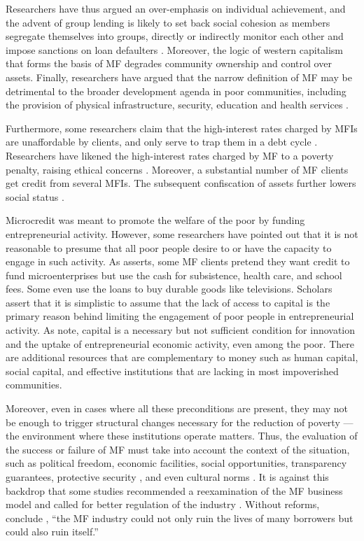 \documentclass[a4paper, nobind]{templates/ociamthesis}
\begin{document}
Researchers have thus argued an over-emphasis on individual achievement, and the advent of group lending is likely to set back social cohesion as members segregate themselves into groups, directly or indirectly monitor each other and impose sanctions on loan defaulters \autocite{chester2016one}. Moreover, the logic of western capitalism that forms the basis of MF degrades community ownership and control over assets. Finally, researchers have argued that the narrow definition of MF may be detrimental to the broader development agenda in poor communities, including the provision of physical infrastructure, security, education and health services \autocite{ghosh2013microfinance}.

Furthermore, some researchers claim that the high-interest rates charged by MFIs are unaffordable by clients, and only serve to trap them in a debt cycle \autocite{wright2016rebuilding}. Researchers have likened the high-interest rates charged by MF to a poverty penalty, raising ethical concerns \autocite{chen2017microfinance}. Moreover, a substantial number of MF clients get credit from several MFIs. The subsequent confiscation of assets further lowers social status \autocite{paprocki2016selling}.

Microcredit was meant to promote the welfare of the poor by funding entrepreneurial activity. However, some researchers have pointed out that it is not reasonable to presume that all poor people desire to or have the capacity to engage in such activity. As \textcite{ghosh2013microfinance} asserts, some MF clients pretend they want credit to fund microenterprises but use the cash for subsistence, health care, and school fees. Some even use the loans to buy durable goods like televisions. Scholars assert that it is simplistic to assume that the lack of access to capital is the primary reason behind limiting the engagement of poor people in entrepreneurial activity. As \textcite{kimmitt2017entrepreneurship} note, capital is a necessary but not sufficient condition for innovation and the uptake of entrepreneurial economic activity, even among the poor. There are additional resources that are complementary to money such as human capital, social capital, and effective institutions that are lacking in most impoverished communities.

Moreover, even in cases where all these preconditions are present, they may not be enough to trigger structural changes necessary for the reduction of poverty --- the environment where these institutions operate matters. Thus, the evaluation of the success or failure of MF must take into account the context of the situation, such as political freedom, economic facilities, social opportunities, transparency guarantees, protective security \textcite{sen2014development}, and even cultural norms \autocite{shahriar2017lender}. It is against this backdrop that some studies recommended a reexamination of the MF business model and called for better regulation of the industry \autocite{johnson2013microfinance,ghosh2013microfinance}. Without reforms, conclude \autocite{chester2016one}, ``the MF industry could not only ruin the lives of many borrowers but could also ruin itself.''
\end{document}
